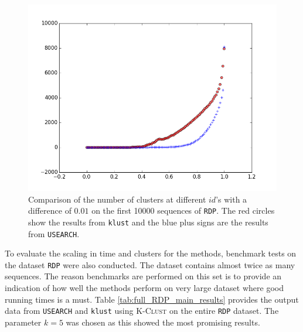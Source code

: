 \begin{figure}[H]
  \includegraphics[width=\textwidth]{graphics/RDP_1000_cluster_counts}
  \caption{Comparison of the number of clusters at different $id$'s with a difference of $0.01$ on the first \num{10000} sequences of \texttt{RDP}. The red circles show the results from \texttt{klust} and the blue plus signs are the results from \texttt{USEARCH}.}
  \label{fig:id_comparison}
\end{figure}

To evaluate the scaling in time and clusters for the methods, benchmark
tests on the dataset \texttt{RDP} were also conducted. The dataset contains
almost twice as many sequences. The reason benchmarks are performed on this
set is to provide an indication of how well the methods perform on very large
dataset where good running times is a must. Table
\ref{tab:full_RDP_main_results} provides the output data from \texttt{USEARCH}
and \texttt{klust} using \textsc{K-Clust} on the entire \texttt{RDP} dataset. The parameter $k=5$ was chosen as this showed the most promising results.


